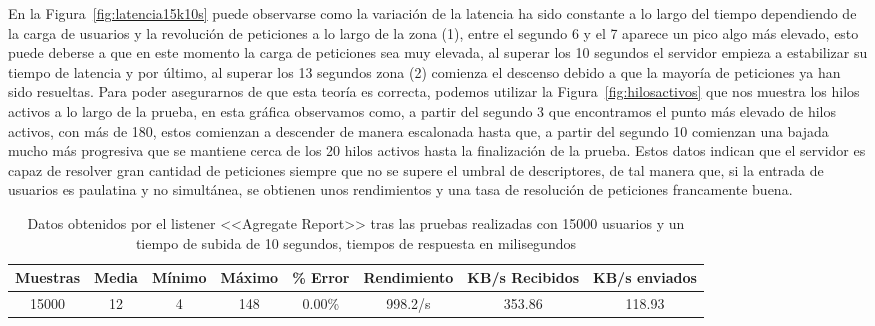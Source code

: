 En la Figura~\ref{fig:latencia15k10s} puede observarse como la variación de la latencia ha sido constante a lo largo del tiempo dependiendo de la carga de usuarios y la revolución de peticiones a lo largo de la zona (1), entre el segundo 6 y el 7 aparece un pico algo más elevado, esto puede deberse a que en este momento la carga de peticiones sea muy elevada, al superar los 10 segundos el servidor empieza a estabilizar su tiempo de latencia y por último, al superar los 13 segundos zona (2) comienza el descenso debido a que la mayoría de peticiones ya han sido resueltas. Para poder asegurarnos de que esta teoría es correcta, podemos utilizar la Figura~\ref{fig:hilosactivos} que nos muestra los hilos activos a lo largo de la prueba, en esta gráfica observamos como, a partir del segundo 3 que encontramos el punto más elevado de hilos activos, con más de 180, estos comienzan a descender de manera escalonada hasta que, a partir del segundo 10 comienzan una bajada mucho más progresiva que se mantiene cerca de los 20 hilos activos hasta la finalización de la prueba. Estos datos indican que el servidor es capaz de resolver gran cantidad de peticiones siempre que no se supere el umbral de descriptores, de tal manera que, si la entrada de usuarios es paulatina y no simultánea, se obtienen unos rendimientos y una tasa de resolución de peticiones francamente buena. 




\begin{table}[h]
\begin{center}
\begin{tabular}{|c|c|c|c|c|c|c|c|}
\rowcolor{gray!20}
\hline
Muestras & Media & Mínimo & Máximo & \% Error & Rendimiento & KB/s Recibidos & KB/s enviados \\
\hline
15000 & 12 & 4 & 148 & 0.00\% & 998.2/s & 353.86 & 118.93 \\
\hline
\end{tabular}
\caption[Datos de <<Agregate Report>> con 15000 usuarios y 10 segundos de suboda]{Datos obtenidos por el listener <<Agregate Report>> tras las pruebas realizadas con 15000 usuarios y un tiempo de subida de 10 segundos, tiempos de respuesta en milisegundos}%
\label{tab:1500010sUser}
\end{center}
\end{table}

